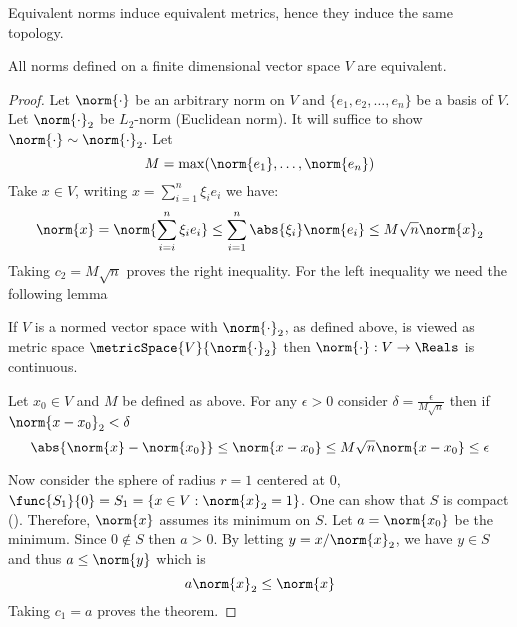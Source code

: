 \begin{remark}
    Equivalent norms induce equivalent metrics, hence they induce the same topology.
\end{remark}

\begin{theorem} \label{th:normsEquivalent}
    All norms defined on a finite dimensional vector space \(V\) are equivalent.
\end{theorem}

\begin{proof}
    Let \(\norm{\cdot}\) be an arbitrary norm on \(V\) and \(\{e_1, e_2, \dots , e_n\} \) be a basis of \(V\). Let \(\norm{\cdot}_2\) be \(L_2\)-norm (Euclidean norm). It will suffice to show \(\norm{\cdot} \sim \norm{\cdot}_2\). Let
    \begin{equation*}
        M = \max \! \left( \norm{e_1}, \dots , \norm{e_n} \right)
    \end{equation*}
    Take \(x \in V\), writing \(x = \sum_{i = 1}^n {\xi_i e_i}\) we have:
    \begin{equation*}
        \norm{x} = \norm{\sum_{i = i}^n {\xi_i e_i}} \leq \sum_{i = 1}^n \abs{\xi_i} \norm{e_i} \leq M \sqrt{n} \norm{x}_2
    \end{equation*}
    Taking \(c_2 = M \sqrt{n}\) proves the right inequality. For the left inequality we need the following lemma
    \begin{lemma} \label{lm:ContinuityOfNorm}
        If \(V\) is a normed vector space with \(\norm{\cdot}_2\), as defined above, is viewed as metric space \(\metricSpace{V}{\norm{\cdot}_2}\) then \(\norm{\cdot} : V \to \Reals\) is continuous.
    \end{lemma}

    \begin{prooflemma}
        Let \(x_0 \in V\) and \(M\) be defined as above. For any \(\epsilon > 0\) consider \(\delta = \frac{\epsilon}{M \sqrt{n}}\) then if \(\norm{x - x_0}_2 < \delta\)
        \begin{equation*}
            \abs{{\norm{x} - \norm{x_0}}} \leq \norm{x - x_0} \leq M \sqrt{n} \norm{x - x_0} \leq \epsilon
        \end{equation*}
    \end{prooflemma}

    Now consider the sphere of radius \(r = 1\) centered at \(0\), \(\func{S_1}{0} = S_1 = \{x \in V : \norm{x}_2 = 1\}\). One can show that \(S\) is compact (). Therefore, \(\norm{x}\) assumes its minimum on \(S\). Let \( a = \norm{x_0}\) be the minimum. Since \(0 \notin S\) then \(a > 0\). By letting \(y = x / \norm{x}_2 \), we have \(y \in S\) and thus \(a \leq \norm{y}\) which is
    \begin{equation*}
        a \norm{x}_2 \leq \norm{x}
    \end{equation*}
    Taking \(c_1 = a\) proves the theorem.
\end{proof}


